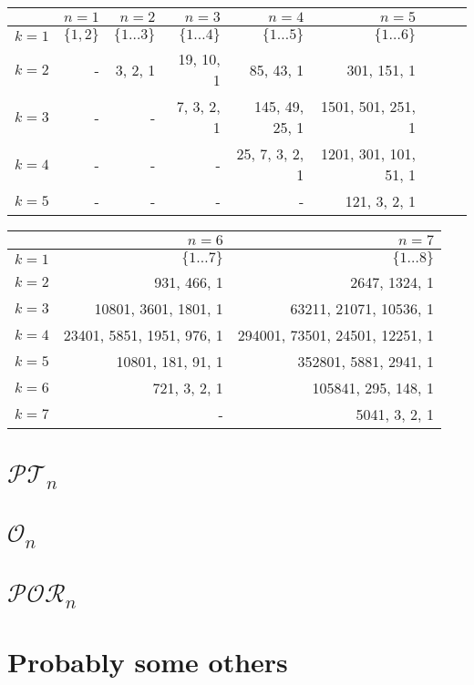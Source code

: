 \begin{table}[h]
  \centering
  \begin{tabular}{|r|r|r|r|r|r|r|r|r|}
    \hline
    & $n=1$ & $n=2$ & $n=3$ & $n=4$ & $n=5$ \\ \hline
    $k=1$ & $\{1, 2\}$ & $\{1\dots 3\}$ & $\{1\dots 4\}$ & $\{1\dots 5\}$ & $\{1\dots 6\}$ \\
    $k=2$ & - & 3, 2, 1 & 19, 10, 1 & 85, 43, 1 & 301, 151, 1 \\
    $k=3$ & - & - & 7, 3, 2, 1 & 145, 49, 25, 1 & 1501, 501, 251, 1 \\
    $k=4$ & - & - & - & 25, 7, 3, 2, 1 & 1201, 301, 101, 51, 1 \\
    $k=5$ & - & - & - & - & 121, 3, 2, 1 \\
    \hline
  \end{tabular}
\end{table}

\begin{table}[h]
  \centering
  \begin{tabular}{|r|r|r|}
    \hline
    & $n=6$ & $n=7$ \\ \hline
    $k=1$ & $\{1\dots 7\}$ & $\{1\dots 8\}$ \\
    $k=2$ & 931, 466, 1 & 2647, 1324, 1 \\
    $k=3$ & 10801, 3601, 1801, 1 & 63211, 21071, 10536, 1 \\
    $k=4$ & 23401, 5851, 1951, 976, 1 & 294001, 73501, 24501, 12251, 1 \\
    $k=5$ & 10801, 181, 91, 1 & 352801, 5881, 2941, 1 \\
    $k=6$ & 721, 3, 2, 1 & 105841, 295, 148, 1 \\
    $k=7$ & - & 5041, 3, 2, 1 \\
    \hline
  \end{tabular}
\end{table}

\section{$\mathcal{PT}_n$}
\label{sec:ptn}

\section{$\mathcal{O}_n$}
\label{sec:on}

\section{$\mathcal{POR}_n$}
\label{sec:porn}

\section{Probably some others}
